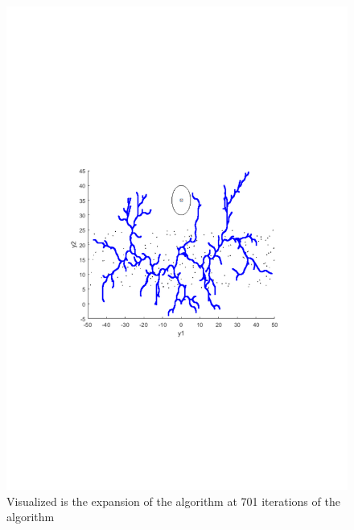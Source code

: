 \begin{figure}[!t]
\begin{minipage}[c]{.8\columnwidth}
    \includegraphics[width=1\columnwidth, trim={0cm, 10cm, 0cm, 9cm}, clip]{figures/experiments/rrtfunnel-701samples-dyn.pdf}
  \caption[The expansion of the \rrtfunnel algorithm at 1, and 101 iterations]{Visualized is the expansion of the \rrtfunnel algorithm at 701 iterations of the algorithm}
  \end{minipage}
\end{figure}

